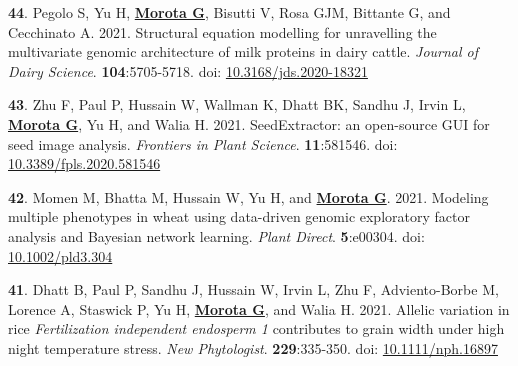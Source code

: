 \documentclass[margin,line,10pt]{res}
\newenvironment{list1}{
  \begin{list}{\ding{113}}{%
      \setlength{\itemsep}{0in}
      \setlength{\parsep}{0in} \setlength{\parskip}{0in}
      \setlength{\topsep}{0in} \setlength{\partopsep}{0in} 
      \setlength{\leftmargin}{0.17in}}}{\end{list}}
\begin{document}
\begin{resume}
\begin{list1}
  \vspace{0.5cm}
  
\item [{\bf 44}.] Pegolo S, Yu H, \textbf{\underline{Morota G}}, Bisutti V, Rosa GJM, Bittante G, and Cecchinato A. 2021. Structural equation modelling for unravelling the multivariate genomic architecture of milk proteins in dairy cattle. \emph{Journal of Dairy Science}. \textbf{104}:5705-5718.  doi: \textcolor{blue}{\href{https://doi.org/10.3168/jds.2020-18321}{10.3168/jds.2020-18321}} 

  \vspace{0.5cm}
  
  \item [{\bf 43}.] Zhu F, Paul P, Hussain W, Wallman K, Dhatt BK, Sandhu J, Irvin L, \textbf{\underline{Morota G}}, Yu H, and Walia H. 2021. SeedExtractor: an open-source GUI for seed image analysis. \emph{Frontiers in Plant Science}. \textbf{11}:581546. doi: \textcolor{blue}{\href{https://doi.org/10.3389/fpls.2020.581546}{10.3389/fpls.2020.581546}}

    \vspace{0.5cm}
    
\item [{\bf 42}.] Momen M, Bhatta M, Hussain W, Yu H, and \textbf{\underline{Morota G}}. 2021. Modeling multiple phenotypes in wheat using data-driven genomic exploratory factor analysis and Bayesian network learning. \emph{Plant Direct}. \textbf{5}:e00304. doi: \textcolor{blue}{\href{https://doi.org/10.1002/pld3.304}{10.1002/pld3.304}}

      \vspace{0.5cm}

  \item [{\bf 41}.] Dhatt B, Paul P, Sandhu J, Hussain W, Irvin L, Zhu F, Adviento-Borbe M, Lorence A, Staswick P, Yu H, \textbf{\underline{Morota G}}, and Walia H. 2021. Allelic variation in rice \textit{Fertilization independent endosperm 1} contributes to grain width under high night temperature stress. \emph{New Phytologist}. \textbf{229}:335-350. doi: \textcolor{blue}{\href{https://doi.org/10.1111/nph.16897}{10.1111/nph.16897}}

  
\end{list1}


\section{}
\begin{list1}


\end{list1}
\end{resume}
\end{document}
